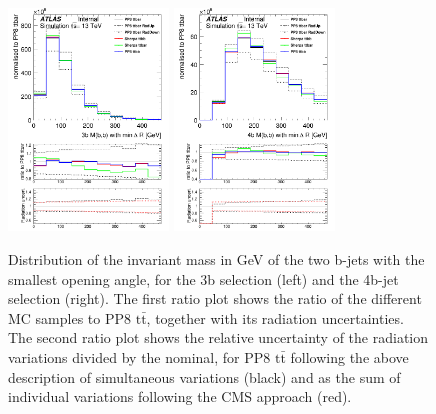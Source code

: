 \begin{figure}[!htb]
\centering
\includegraphics[width=0.38\textwidth]{Plots/ttbb/hisgenEvt_M_MinDeltaRGenBJets_4j3t__div}
\includegraphics[width=0.38\textwidth]{Plots/ttbb/hisgenEvt_M_MinDeltaRGenBJets_4j4t__div}
  \caption{Distribution of the invariant mass in GeV of the two b-jets with the smallest opening angle, for the 3b selection (left) and the 4b-jet selection (right). The first ratio plot shows the ratio of the different MC samples to PP8 $\mathrm{t\bar{t}}$, together with its radiation uncertainties. The second ratio plot shows the relative uncertainty of the radiation variations divided by the nominal, for PP8 $\mathrm{t\bar{t}}$ following the above description of simultaneous variations (black) and as the sum of individual variations following the CMS approach (red). \label{ttbb:MbbminDR}}
\end{figure}

